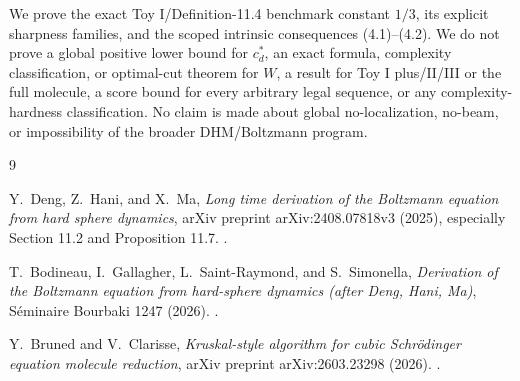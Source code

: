 \documentclass[12pt]{article}
\begin{document}
We prove the exact Toy I/Definition-11.4 benchmark constant \(1/3\), its explicit
sharpness families, and the scoped intrinsic consequences (4.1)--(4.2).  We do
not prove a global positive lower bound for \(c_d^*\), an exact formula,
complexity classification, or optimal-cut theorem for \(W\), a result for Toy I
plus/II/III or the full molecule, a score bound for every
arbitrary legal sequence, or any complexity-hardness classification.  No claim
is made about global no-localization, no-beam, or impossibility of the broader
DHM/Boltzmann program.

\begin{thebibliography}{9}

Y.~Deng, Z.~Hani, and X.~Ma,
\emph{Long time derivation of the Boltzmann equation from hard sphere dynamics},
arXiv preprint arXiv:2408.07818v3 (2025), especially Section 11.2 and
Proposition 11.7.  .

T.~Bodineau, I.~Gallagher, L.~Saint-Raymond, and S.~Simonella,
\emph{Derivation of the Boltzmann equation from hard-sphere dynamics
(after Deng, Hani, Ma)}, S\'eminaire Bourbaki 1247 (2026).
.

Y.~Bruned and V.~Clarisse,
\emph{Kruskal-style algorithm for cubic Schr\"odinger equation molecule
reduction}, arXiv preprint arXiv:2603.23298 (2026).
.

\end{thebibliography}
\end{document}
